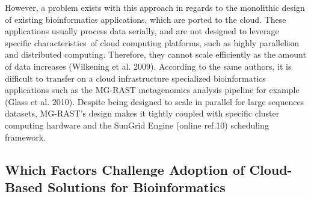 \documentclass[10pt]{bmc_article}
\newenvironment{bmcformat}{\begin{raggedright}\baselineskip20pt\sloppy\setboolean{publ}{false}}{\end{raggedright}\baselineskip20pt\sloppy}
\begin{document}
\begin{bmcformat}
      However, a problem exists with this approach in regards to the monolithic design of
      existing bioinformatics applications, which are ported to the cloud. These applications
      usually process data serially, and are not designed to leverage specific
      characteristics of cloud computing platforms, such as highly parallelism and distributed
      computing. Therefore, they cannot scale efficiently as the amount of data increases
      (Wilkening et al. 2009). According to the same authors, it is difficult to transfer on a
      cloud infrastructure specialized bioinformatics applications such as the MG-RAST
      metagenomics analysis pipeline for example (Glass et al. 2010). Despite being designed to
      scale in parallel for large sequences datasets, MG-RAST's design makes it tightly coupled
      with specific cluster computing hardware and the SunGrid Engine (online ref.10) scheduling
      framework.

  \subsection*{Which Factors Challenge Adoption of Cloud-Based Solutions for Bioinformatics }


\end{bmcformat}
\end{document}
